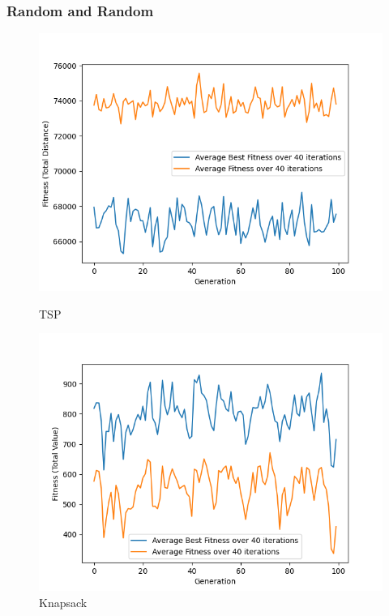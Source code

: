 \documentclass[11pt, letterpaper]{article}
\begin{document}
\subsubsection {Random and Random}
\begin{figure}[H]
  \includegraphics[width=\linewidth]{images/tsp_rd_rd.png}
  \caption{TSP}
\endminipage\hfill
{}
  \includegraphics[width=\linewidth]{images/knapsack_rd_rd.png}
  \caption{Knapsack}
\endminipage\hfill
{}%

\end{figure}
\end{document}
